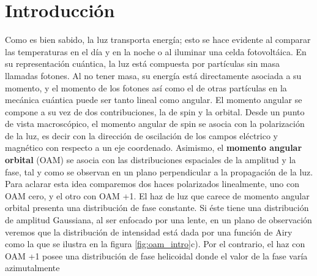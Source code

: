 


\chapter{Introducción}
\label{cha:Introduccion}
\graphicspath{{Figures/intro_img/}{../Figures/intro_img/}}

Como es bien sabido, la luz transporta energía; esto se hace evidente al
comparar las temperaturas en el día y en la noche o al iluminar una celda
fotovoltáica. En su representación cuántica, la luz está
compuesta por partículas sin masa llamadas fotones. Al no tener masa,
su energía está directamente asociada a su momento, y el momento de 
los fotones así como el de otras partículas en la mecánica cuántica puede ser tanto
lineal como angular. El momento angular se compone a su vez de dos
contribuciones, la de spin y la orbital. Desde un punto de vista 
macroscópico, el momento angular de spin se asocia con la polarización
de la luz, es decir con la dirección de oscilación de los campos
eléctrico y magnético con respecto a un eje coordenado. Asimismo, el
\textbf{momento angular orbital} (OAM) se asocia con las distribuciones
espaciales de la amplitud y la fase, tal y como se observan
en un plano perpendicular a la propagación de la luz. Para aclarar esta idea
comparemos dos haces polarizados linealmente, uno con OAM
cero, y el otro con OAM +1. El haz de luz que carece de momento
angular orbital presenta una distribución de fase constante. Si éste tiene una distribución de amplitud
Gaussiana, al ser enfocado por una lente, en un plano de
observación veremos que la distribución de intensidad está dada por una función de
Airy como la que se ilustra en la figura \ref{fig:oam_intro}c). 
Por el contrario, el haz con OAM +1 posee una distribución
 de fase helicoidal donde el valor de la fase varía azimutalmente
